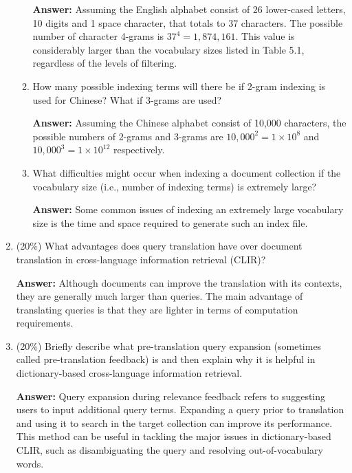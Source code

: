 \documentclass[11pt]{article}
\begin{document}
\begin{enumerate}
\begin{enumerate}
            \textbf{Answer:} Assuming the English alphabet consist of 26 lower-cased letters, 10 digits and 1 space character, that totals to 37 characters. The possible number of character 4-grams is $37^4=1,874,161$. This value is considerably larger than the vocabulary sizes listed in Table 5.1, regardless of the levels of filtering.

            \item How many possible indexing terms will there be if 2-gram indexing is used for Chinese? What if 3-grams are used?

            \textbf{Answer:} Assuming the Chinese alphabet consist of 10,000 characters, the possible numbers of 2-grams and 3-grams are $10,000^2=1\times10^8$ and $10,000^3=1\times10^{12}$ respectively.

            \item What difficulties might occur when indexing a document collection if the vocabulary size (i.e., number of indexing terms) is extremely large?

            \textbf{Answer:} Some common issues of indexing an extremely large vocabulary size is the time and space required to generate such an index file.

        \end{enumerate}

        \item (20\%) What advantages does query translation have over document translation in cross-language information retrieval (CLIR)?

        \textbf{Answer:} Although documents can improve the translation with its contexts, they are generally much larger than queries. The main advantage of translating queries is that they are lighter in terms of computation requirements.

        \item (20\%) Briefly describe what pre-translation query expansion (sometimes called pre-translation feedback) is and then explain why it is helpful in dictionary-based cross-language information retrieval.

        \textbf{Answer:} Query expansion during relevance feedback refers to suggesting users to input additional query terms. Expanding a query prior to translation and using it to search in the target collection can improve its performance. This method can be useful in tackling the major issues in dictionary-based CLIR, such as disambiguating the query and resolving out-of-vocabulary words.

    \end{enumerate}
\end{document}

